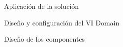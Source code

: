 \begin{chapter}{Aplicación de la solución}
\begin{section}{Diseño y configuración del VI Domain}
\begin{subsection}{Diseño de los componentes}
    \end{subsection}

\end{section}


\end{chapter}
